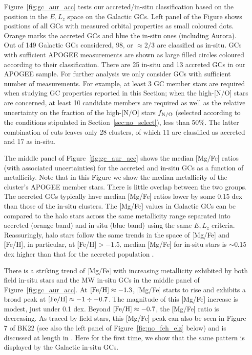 \documentclass[a4paper,useAMS,usenatbib]{mnras}
\begin{document}
Figure~\ref{fig:gc_aur_acc} tests our accreted/in-situ classification based on the position in the $E, L_z$ space on the Galactic GCs. Left panel of the Figure shows positions of all GCs with measured orbital properties as small coloured dots. Orange marks the accreted GCs and blue the in-situ ones (including Aurora).  Out of 149 Galactic GCs considered, 98, or $\approx 2/3$ are classified as in-situ. GCs with sufficient APOGEE measurements are shown as large filled circles coloured according to their classification. There are 25 in-situ and 13 accreted GCs in our APOGEE sample. For further analysis we only consider GCs with sufficient number of measurements. For example, at least 3 GC member stars are required when studying GC properties reported in this Section; when the high-[N/O] stars are concerned, at least 10 candidate members are required as well as the relative uncertainty on the fraction of the high-[N/O] stars $f_{\rm N/O}$ (selected according to the conditions stipulated in Section~\ref{sec:no_select}), less than 50\%. The latter combination of cuts leaves only 28 clusters, of which 11 are classified as accreted and 17 as in-situ.

The middle panel of Figure~\ref{fig:gc_aur_acc} shows the median [Mg/Fe] ratios (with associated uncertainties) for the accreted and in-situ GCs as a function of metallicity. Note that in this Figure we show the median metallicity of the cluster's APOGEE member stars. There is little overlap between the two groups. The accreted GCs typically have median [Mg/Fe] ratios lower by some 0.15 dex than those of the in-situ clusters. The [Mg/Fe] values in Galactic GCs can be compared to the halo stars across the same metallicity range separated into accreted (orange band) and in-situ (blue band) using the same $E, L_z$ criteria. Reassuringly, halo stars follow the same trends in the space of [Mg/Fe] and [Fe/H], in particular, at [Fe/H]$>-1.5$, median [Mg/Fe] for in-situ stars is $\sim0.15$ dex higher than that for the accreted population \citep[a similar conclusion is reached in][]{Horta_GC}. 

There is a striking trend of [Mg/Fe] with increasing metallicity exhibited by both field in-situ stars and the MW in-situ GCs in the middle panel of Figure~\ref{fig:gc_aur_acc}. At $\rm [Fe/H]\approx-1.3$, [Mg/Fe] starts to rise and exhibits a broad peak at $\rm [Fe/H]\approx-1\div -0.7$. The magnitude of this [Mg/Fe] increase is modest, just under 0.1 dex. Beyond $\rm [Fe/H]\approx -0.7$, the [Mg/Fe] ratio is decreasing. As traced by field stars, this [Mg/Fe] peak can also be seen in Figure 7 of BK22 (see also the left panel of Figure~\ref{fig:no_feh_elz} below) and is discussed at length in \citet{Conroy2022}. Here for the first time, we show that the same pattern is displayed by the Galactic in-situ GCs. 
\end{document}
